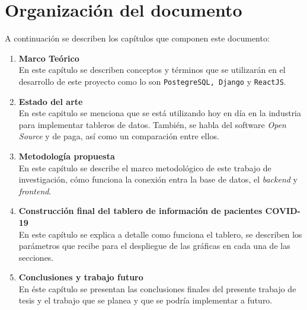
\section {Organización del documento}\label{intro_org}

A continuación se describen los capítulos que componen este documento:

\begin{enumerate}
    \item \textbf{Marco Teórico}\\
    En este capítulo se describen conceptos y términos que se utilizarán en el desarrollo de este proyecto como lo son \texttt{PostegreSQL, Django} y \texttt{ReactJS}.

    \item \textbf{Estado del arte}\\
    En este capitulo se menciona que se está utilizando hoy en día en la industria para implementar tableros de datos. También, se habla del software \textit{Open Source} y de paga, así como un comparación entre ellos. 

    \item \textbf{Metodología propuesta}\\
    En este capítulo se describe el marco metodológico de este trabajo de investigación, cómo funciona la conexión entra la base de datos, el \textit{backend} y \textit{frontend}.

    \item \textbf{Construcción final del tablero de información de pacientes COVID-19}\\
    En este capítulo se explica a detalle como funciona el tablero, se describen los parámetros que recibe para el despliegue de las gráficas en cada una de las secciones.
    
    \item \textbf{Conclusiones y trabajo futuro}\\
    En éste capítulo se presentan las conclusiones finales del presente trabajo de tesis y el trabajo que se planea y que se podría implementar a futuro.

\end{enumerate}

